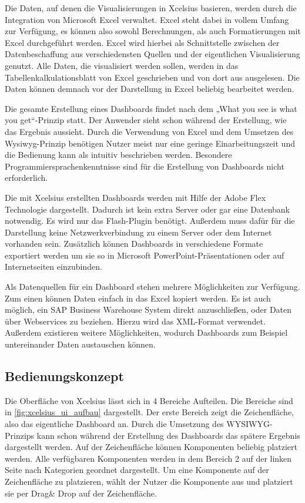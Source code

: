 Die Daten, auf denen die Visualisierungen in Xcelsius basieren, werden durch die Integration von Microsoft Excel verwaltet. Excel steht dabei in vollem Umfang zur Verfügung, es können also sowohl  Berechnungen, als auch Formatierungen mit Excel durchgeführt werden. Excel wird hierbei als Schnittstelle zwischen der Datenbeschaffung aus verschiedensten Quellen und der eigentlichen Visualisierung genutzt. Alle Daten, die visualisiert werden sollen, werden in das Tabellenkalkulationsblatt von Excel geschrieben und von dort aus ausgelesen. Die Daten können demnach vor der Darstellung in Excel beliebig bearbeitet werden.

Die gesamte Erstellung eines Dashboards findet nach dem „What you see is what you get“-Prinzip statt. Der Anwender sieht schon während der Erstellung, wie das Ergebnis aussieht. Durch die Verwendung von Excel und dem Umsetzen des Wysiwyg-Prinzip benötigen Nutzer meist nur eine geringe Einarbeitungszeit und die Bedienung kann als intuitiv beschrieben werden. Besondere Programmiersprachenkenntnisse sind für die Erstellung von Dashboards nicht erforderlich.

Die mit Xcelsius erstellten Dashboards werden mit Hilfe der Adobe Flex Technologie dargestellt. Dadurch ist kein extra Server oder gar eine Datenbank notwendig. Es wird nur das Flash-Plugin benötigt. Außerdem muss dafür für die Darstellung keine Netzwerkverbindung zu einem Server oder dem Internet vorhanden sein.  Zusätzlich können Dashboards in verschiedene Formate exportiert werden um sie so in Microsoft PowerPoint-Präsentationen oder auf Internetseiten einzubinden.

Als Datenquellen für ein Dashboard stehen mehrere Möglichkeiten zur Verfügung. Zum einen können Daten einfach in das Excel kopiert werden.  Es ist auch möglich, ein SAP Business Warehouse System direkt anzuschließen, oder Daten über Webservices zu beziehen. Hierzu wird das XML-Format verwendet. Außerdem existieren weitere Möglichkeiten, wodurch Dashboards zum Beispiel untereinander Daten austauschen können.

\subsection{Bedienungskonzept}
Die Oberfläche von Xcelsius lässt sich in 4 Bereiche Aufteilen. Die Bereiche sind in \vref{fig:xcelsius_ui_aufbau} dargestellt. Der erste Bereich zeigt die Zeichenfläche, also das eigentliche Dashboard an. Durch die Umsetzung des WYSIWYG-Prinzips kann schon während der Erstellung des Dashboards das spätere Ergebnis dargestellt werden. Auf der Zeichenfläche können Komponenten beliebig platziert werden. Alle verfügbaren Komponenten werden in dem Bereich 2 auf der linken Seite nach Kategorien geordnet dargestellt. Um eine Komponente auf der Zeichenfläche zu platzieren, wählt der Nutzer die Komponente aus und platziert sie per Drag\& Drop auf der Zeichenfläche. 

